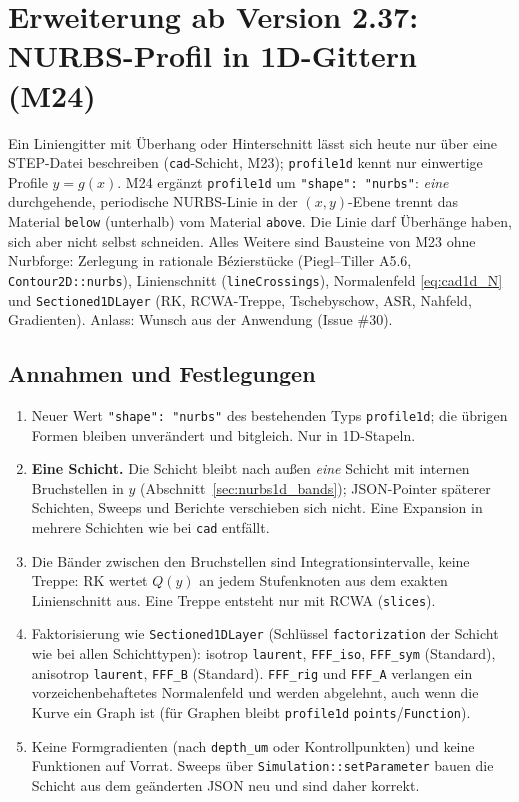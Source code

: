 \clearpage
\section{Erweiterung ab Version 2.37: NURBS-Profil in 1D-Gittern (M24)}\label{sec:nurbs1d}
Ein Liniengitter mit Überhang oder Hinterschnitt lässt sich heute nur über eine STEP-Datei beschreiben
(\verb|cad|-Schicht, M23); \verb|profile1d| kennt nur einwertige Profile $y=g(x)$. M24 ergänzt \verb|profile1d| um
\verb|"shape": "nurbs"|: \emph{eine} durchgehende, periodische NURBS-Linie in der $(x,y)$-Ebene trennt das Material
\verb|below| (unterhalb) vom Material \verb|above|. Die Linie darf Überhänge haben, sich aber nicht selbst schneiden.
Alles Weitere sind Bausteine von M23 ohne Nurbforge: Zerlegung in rationale Bézierstücke (Piegl--Tiller A5.6,
\verb|Contour2D::nurbs|), Linienschnitt (\verb|lineCrossings|), Normalenfeld \eqref{eq:cad1d_N} und
\verb|Sectioned1DLayer| (RK, RCWA-Treppe, Tschebyschow, ASR, Nahfeld, Gradienten). Anlass: Wunsch aus der
Anwendung (Issue \#30).

\subsection{Annahmen und Festlegungen}
\begin{enumerate}[nosep]
  \item Neuer Wert \verb|"shape": "nurbs"| des bestehenden Typs \verb|profile1d|; die übrigen Formen bleiben unverändert
        und bitgleich. Nur in 1D-Stapeln.
  \item \textbf{Eine Schicht.} Die Schicht bleibt nach außen \emph{eine} Schicht mit internen Bruchstellen in $y$
        (Abschnitt~\ref{sec:nurbs1d_bands}); JSON-Pointer späterer Schichten, Sweeps und Berichte verschieben sich
        nicht. Eine Expansion in mehrere Schichten wie bei \verb|cad| entfällt.
  \item Die Bänder zwischen den Bruchstellen sind Integrationsintervalle, keine Treppe: RK wertet $Q(y)$ an jedem
        Stufenknoten aus dem exakten Linienschnitt aus. Eine Treppe entsteht nur mit RCWA (\verb|slices|).
  \item Faktorisierung wie \verb|Sectioned1DLayer| (Schlüssel \verb|factorization| der Schicht wie bei allen
        Schichttypen): isotrop \verb|laurent|, \verb|FFF_iso|, \verb|FFF_sym| (Standard),
        anisotrop \verb|laurent|, \verb|FFF_B| (Standard). \verb|FFF_rig| und \verb|FFF_A| verlangen ein
        vorzeichenbehaftetes Normalenfeld und werden abgelehnt, auch wenn die Kurve ein Graph ist (für Graphen
        bleibt \verb|profile1d| \verb|points|/\verb|Function|).
  \item Keine Formgradienten (nach \verb|depth_um| oder Kontrollpunkten) und keine Funktionen auf Vorrat. Sweeps
        über \verb|Simulation::setParameter| bauen die Schicht aus dem geänderten JSON neu und sind daher korrekt.
\end{enumerate}

